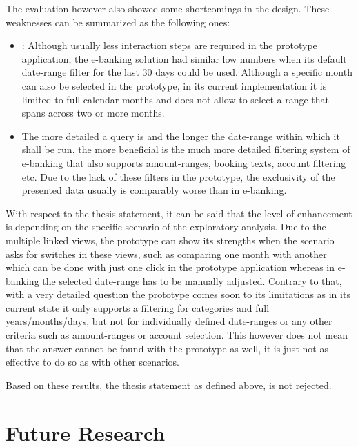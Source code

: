 The evaluation however also showed some shortcomings in the design. These weaknesses can be summarized as the following ones:
\begin{itemize}[]
	\item: Although usually less interaction steps are required in the prototype application, the e-banking solution had similar low numbers when its default date-range filter for the last 30 days could be used. Although a specific month can also be selected in the prototype, in its current implementation it is limited to full calendar months and does not allow to select a range that spans across two or more months.
	\item The more detailed a query is and the longer the date-range within which it shall be run, the more beneficial is the much more detailed filtering system of e-banking that also supports amount-ranges, booking texts, account filtering etc. Due to the lack of these filters in the prototype, the exclusivity of the presented data usually is comparably worse than in e-banking.
\end{itemize}

With respect to the thesis statement, it can be said that the level of enhancement is depending on the specific scenario of the exploratory analysis. Due to the multiple linked views, the prototype can show its strengths when the scenario asks for switches in these views, such as comparing one month with another which can be done with just one click in the prototype application whereas in e-banking the selected date-range has to be manually adjusted. Contrary to that, with a very detailed question the prototype comes soon to its limitations as in its current state it only supports a filtering for categories and full years/months/days, but not for individually defined date-ranges or any other criteria such as amount-ranges or account selection. This however does not mean that the answer cannot be found with the prototype as well, it is just not as effective to do so as with other scenarios.
\begin{framed}
	\textit{\thesisstatementtext}
\end{framed}

Based on these results, the thesis statement as defined above, is not rejected.



\section{Future Research}

